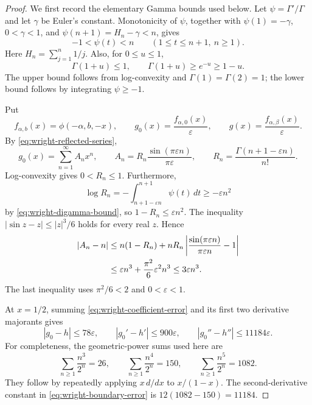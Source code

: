 \documentclass[11pt,a4paper]{article}
\theoremstyle{definition}
\theoremstyle{remark}
\numberwithin{equation}{section}
\begin{document}
\begin{proof}
We first record the elementary Gamma bounds used below. Let
$\psi=\Gamma'/\Gamma$ and let $\gamma$ be Euler's constant.
Monotonicity of $\psi$, together with
$\psi(1)=-\gamma$, $0<\gamma<1$, and
$\psi(n+1)=H_n-\gamma<n$, gives
\begin{equation}
 -1<\psi(t)<n\qquad(1\leq t\leq n+1,\ n\geq1).
 \label{eq:wright-digamma-bound}
\end{equation}
Here $H_n=\sum_{j=1}^n1/j$. Also, for $0\leq u\leq1$,
\begin{equation}
 \Gamma(1+u)\leq1,
 \qquad
 \Gamma(1+u)\geq e^{-u}\geq1-u.
 \label{eq:wright-gamma-unit-bounds}
\end{equation}
The upper bound follows from log-convexity and
$\Gamma(1)=\Gamma(2)=1$; the lower bound follows by integrating
$\psi\geq-1$.

Put
\[
 f_{\alpha,b}(x)=\phi(-\alpha,b,-x),\qquad
 g_0(x)=\frac{f_{\alpha,0}(x)}{\varepsilon},\qquad
 g(x)=\frac{f_{\alpha,\beta}(x)}{\varepsilon}.
\]
By \eqref{eq:wright-reflected-series},
\[
 g_0(x)=\sum_{n=1}^{\infty}A_nx^n,\qquad
 A_n=R_n\frac{\sin(\pi\varepsilon n)}{\pi\varepsilon},\qquad
 R_n=\frac{\Gamma(n+1-\varepsilon n)}{n!}.
\]
Log-convexity gives $0<R_n\leq1$. Furthermore,
\[
 \log R_n
 =-\int_{n+1-\varepsilon n}^{n+1}\psi(t)\,dt
 \geq-\varepsilon n^2
\]
by \eqref{eq:wright-digamma-bound}, so
$1-R_n\leq\varepsilon n^2$. The inequality
$|\sin z-z|\leq|z|^3/6$ holds for every real $z$. Hence
\begin{align}
 |A_n-n|
 &\leq n(1-R_n)
   +nR_n\left|\frac{\sin(\pi\varepsilon n)}
                         {\pi\varepsilon n}-1\right| \notag\\
 &\leq\varepsilon n^3+\frac{\pi^2}{6}\varepsilon^2n^3
 \leq3\varepsilon n^3.
 \label{eq:wright-coefficient-error}
\end{align}
The last inequality uses $\pi^2/6<2$ and $0<\varepsilon<1$.

At $x=1/2$, summing \eqref{eq:wright-coefficient-error} and its first
two derivative majorants gives
\begin{equation}
 |g_0-h|\leq78\varepsilon,\qquad
 |g_0'-h'|\leq900\varepsilon,\qquad
 |g_0''-h''|\leq11184\varepsilon.
 \label{eq:wright-boundary-error}
\end{equation}
For completeness, the geometric-power sums used here are
\[
 \sum_{n\geq1}\frac{n^3}{2^n}=26,\qquad
 \sum_{n\geq1}\frac{n^4}{2^n}=150,\qquad
 \sum_{n\geq1}\frac{n^5}{2^n}=1082.
\]
They follow by repeatedly applying $x\,d/dx$ to $x/(1-x)$.
The second-derivative constant in
\eqref{eq:wright-boundary-error} is
$12(1082-150)=11184$.


\end{proof}
\end{document}
